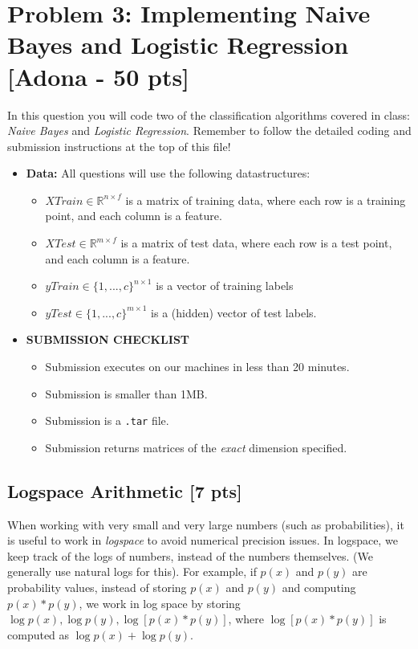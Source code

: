 \section*{Problem 3: Implementing Naive Bayes and Logistic Regression [Adona - 50 pts]}

In this question you will code two of the classification algorithms covered in class: \emph{Naive Bayes} and \emph{Logistic Regression}. Remember to follow the detailed coding and submission instructions at the top of this file!

\begin{itemize}
\item \textbf{Data:} All questions will use the following datastructures:
\begin{itemize}
\item $\mathit{XTrain} \in \mathbb{R} ^{n \times f}$ is a matrix of training data, where each row is a training point, and each column is a feature.
\item $\mathit{XTest} \in \mathbb{R} ^{m \times f}$ is a matrix of test data, where each row is a test point, and each column is a feature.
\item $\mathit{yTrain} \in \{1,...,c\}^{n \times 1} $ is a vector of training labels
\item $\mathit{yTest} \in \{1,...,c\}^{m \times 1} $ is a (hidden) vector of test labels. 
\end{itemize}  


\item \textbf{SUBMISSION CHECKLIST}
\begin{itemize}
\item Submission executes on our machines in less than 20 minutes.
\item Submission is smaller than 1MB.
\item Submission is a \verb#.tar# file.
\item Submission returns matrices of the \emph{exact} dimension specified.
\end{itemize}
\end{itemize}

\newpage
\subsection*{Logspace Arithmetic [7 pts]}

When working with very small and very large numbers (such as probabilities), it is useful to work in \emph{logspace} to avoid numerical precision issues. In logspace, we keep track of the logs of numbers, instead of the numbers themselves. (We generally use natural logs for this). For example, if $p(x)$ and $p(y)$ are probability values, instead of storing $p(x)$ and $p(y)$ and computing $p(x)*p(y)$, we work in log space by storing $\log p(x), \log p(y), \log [p(x)*p(y)]$, where $\log [p(x)*p(y)]$ is computed as $\log p(x)+\log p(y)$.

